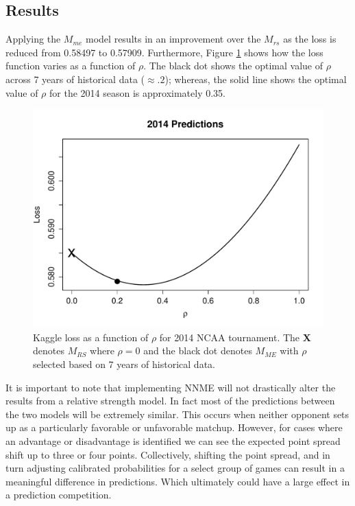 \documentclass[letterpaper,12pt]{article}
\begin{document}
 \subsection{Results}
Applying the $M_{me}$ model results in an improvement over the $M_{rs}$ as the loss is reduced from 0.58497 to 0.57909.  Furthermore, Figure \ref{fig:result} shows how the loss function varies as a function of $\rho$. The black dot  shows the optimal value of $\rho$ across 7 years of historical data ($\approx .2$); whereas, the solid line shows the optimal value of $\rho$ for the 2014 season is approximately 0.35. 
\begin{figure}[h!]
\centering
\includegraphics[width=.75\textwidth]{Predictions.pdf}
\caption{Kaggle loss as a function of $\rho$ for 2014 NCAA tournament. The {\bf X} denotes $M_{RS}$ where $\rho = 0$ and the black dot denotes $M_{ME}$ with $\rho$ selected based on 7 years of historical data.}
\label{fig:result}
\end{figure} 

It is important to note that implementing NNME will not drastically alter the results from a relative strength model. In fact most of the predictions between the two models will be extremely similar. This occurs when neither opponent sets up as a particularly favorable or unfavorable matchup. However, for cases where an advantage or disadvantage is identified we can see the expected point spread shift up to three or four points. Collectively, shifting the point spread, and in turn adjusting calibrated probabilities for a select group of games can result in a meaningful difference in predictions. Which ultimately could have a large effect in a prediction competition.
\end{document}
